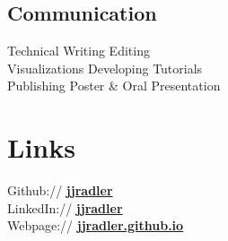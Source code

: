 \documentclass[letterpaper]{deedy-resume} %
\begin{document}
\begin{minipage}[t]{0.32\textwidth}
\subsection{Communication}
Technical Writing \textbullet{} Editing\\
Visualizations \textbullet{} Developing Tutorials\\
Publishing \textbullet{} Poster \& Oral Presentation

\sectionspace

\section{Links} 
Github:// \href{https://github.com/jjradler}{\bf jjradler} \\
LinkedIn:// \href{https://www.linkedin.com/in/jjradler/}{\bf jjradler} \\
Webpage:// \href{http://jjradler.github.io}{\bf jjradler.github.io}

\end{minipage} %
\vspace{0pt}
\end{document}
